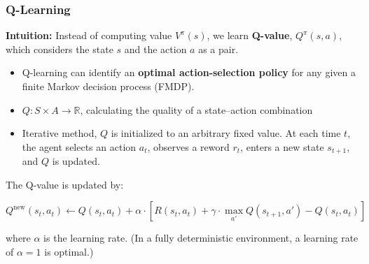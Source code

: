\documentclass[aspectratio=169, 10pt]{beamer}
\begin{document}
\begin{frame}[t]
\frametitle{Q-Learning}

\textbf{Intuition:} 
Instead of computing value $V^\pi(s)$, we learn \textbf{Q-value}, $Q^\pi(s, a)$, which considers the state $s$ and the action $a$ as a pair.

\begin{itemize}
    \item Q-learning can identify an \textbf{optimal action-selection policy} for any given a finite Markov decision process (FMDP).
    \item $Q: S \times A \to \mathbb{R}$, calculating the quality of a state–action combination
    \item Iterative method, $Q$ is initialized to an arbitrary fixed value. At each time $t$, the agent selects an action $a_t$, observes a reword $r_t$, enters a new state $s_{t+1}$, and $Q$ is updated.
\end{itemize}

\vspace{0.5em}
The Q-value is updated by:

\begin{equation*}
    Q^{\text{new}}(s_t, a_t) \gets Q(s_t, a_t) + \alpha \cdot [R(s_t, a_t) + \gamma \cdot \max_{a'}Q(s_{t+1}, a') - Q(s_t, a_t)]
\end{equation*}

where $\alpha$ is the learning rate. (In a fully deterministic environment, a learning rate of $\alpha = 1$ is optimal.)
\end{frame}
\end{document}
